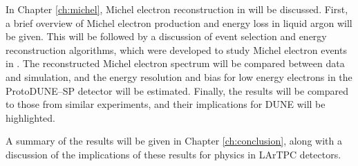 In Chapter \ref{ch:michel}, Michel electron reconstruction in \protodune{} will
be discussed. First, a brief overview of Michel electron production and energy 
loss in liquid argon will be given. This will be followed by a discussion of 
event selection and energy reconstruction algorithms, which were developed to 
study Michel electron events in \protodune{}. The reconstructed Michel electron 
spectrum will be compared between data and simulation, and the energy resolution
and bias for low energy electrons in the ProtoDUNE--SP detector will be 
estimated. Finally, the results will be compared to those from similar 
experiments, and their implications for DUNE will be highlighted.

A summary of the results will be given in Chapter \ref{ch:conclusion}, along 
with a discussion of the implications of these results for physics in LArTPC 
detectors.
